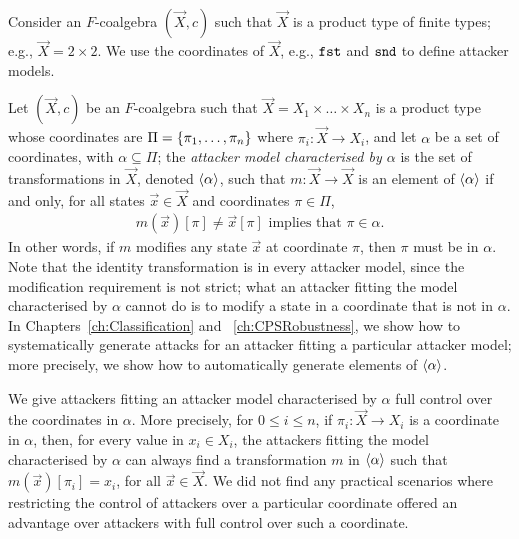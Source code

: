 Consider an $F$-coalgebra $(\vec{X},c)$ such that $\vec{X}$ is a product type of finite types; e.g., $\vec{X}=2\times 2$. We use the coordinates of $\vec{X}$, e.g., $\mathtt{\texttt{fst}}$ and $\mathtt{\texttt{snd}}$ to define attacker models. 
\begin{definition}
\label{def:Latent:AttackerModel}
Let $(\vec{X},c)$ be an $F$-coalgebra such that $\vec{X}=X_1\times\ldots\times X_n$ is a product type whose coordinates are $\Pi=\left\{\pi_1, \ldots, \pi_n\right\}$ where $\pi_i\colon \vec{X}\rightarrow X_i$, and let $\alpha$ be a set of coordinates, with $\alpha\subseteq \Pi$; the \emph{attacker model characterised by $\alpha$} is the set of transformations in $\vec{X}$, denoted ${{\left<\alpha\right>}}$, such that $m\colon \vec{X}\rightarrow \vec{X}$ is an element of ${{\left<\alpha\right>}}$ if and only, for all states $\vec{x}\in \vec{X}$ and coordinates $\pi\in \Pi$, 
\begin{align}
    m(\vec{x})[\pi]\neq \vec{x}[\pi]\text{ implies that $\pi\in \alpha$}.
\end{align}
In other words, if $m$ modifies any state $\vec{x}$ at coordinate $\pi$, then $\pi$ must be in $\alpha$. Note that the identity transformation is in every attacker model, since the modification requirement is not strict; %
what an attacker fitting the model characterised by $\alpha$ cannot do is to modify a state in a coordinate that is not in $\alpha$. In Chapters~\ref{ch:Classification} and ~\ref{ch:CPSRobustness}, we show how to systematically generate attacks for an attacker fitting a particular attacker model; more precisely, we show how to automatically generate elements of ${{\left<\alpha\right>}}$.

We give attackers fitting an attacker model characterised by $\alpha$ full control over the coordinates in $\alpha$. More precisely, for $0\leq i \leq n$, if $\pi_i\colon \vec{X}\rightarrow X_i$ is a coordinate in $\alpha$, then, for every value in $x_i\in X_i$, the attackers fitting the model characterised by $\alpha$ can always find a transformation $m$ in ${{\left<\alpha\right>}}$ such that $m(\vec{x})[\pi_i]=x_i$, for all $\vec{x}\in \vec{X}$. We did not find any practical scenarios where restricting the control of attackers over a particular coordinate offered an advantage over attackers with full control over such a coordinate.
\end{definition}

